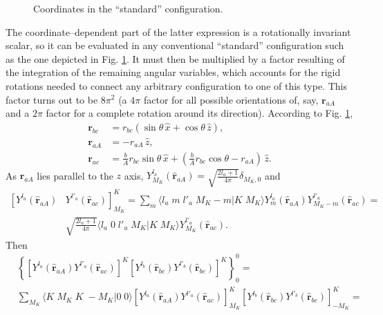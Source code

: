 \begin{subappendices}
\begin{figure}
\vspace{-3cm}
\caption{Coordinates in the ``standard'' configuration.}\label{figC6AppF2}
\end{figure}
The coordinate--dependent part of the latter expression is  a rotationally invariant scalar, so it can be evaluated in any conventional ``standard'' configuration such as the one depicted in Fig. \ref{figC6AppF2}. It must then be multiplied by a factor resulting of the integration of the remaining angular variables, which accounts for the rigid rotations needed to connect any arbitrary configuration to one of this type. This factor turns out to be $8\pi^2$ (a $4\pi$ factor for all possible orientations of, say, $\mathbf r_{aA}$ and a $2\pi$ factor for a complete rotation around its direction). According to Fig. \ref{figC6AppF2},
\begin{equation}\label{eqC6AppF22}
\begin{split}
\mathbf{r}_{bc}&=r_{bc}\left(\sin \theta\, \hat x+\cos \theta\,\hat z \right),\\
\mathbf{r}_{aA}&=-r_{aA}\,\hat z,\\
\mathbf{r}_{ac}&=\frac{b}{A}r_{bc}\sin \theta\,\hat x+\left(\frac{b}{A}r_{bc}\cos \theta-r_{aA}\right)\,\hat z.
\end{split}
\end{equation}
As $\mathbf{r}_{aA}$ lies parallel to the $z$ axis, $Y^{l_a}_{M_K} (\hat{\mathbf r}_{aA})=\sqrt{\frac{2l_a+1}{4\pi}}\delta_{M_K,0}$ and
\begin{equation}\label{eqC6AppG22}
\begin{split}
\left[ Y^{l_a} (\hat{\mathbf r}_{aA})\right.&\left. Y^{l'_a} (\hat{ \mathbf r}_{ac})\right]^K_{M_K}=\sum_{m}\langle l_a\;m\;l'_a\;M_K-m|K\;M_K\rangle Y^{l_a}_{m} (\hat{ \mathbf r}_{aA})Y^{l'_a}_{M_K-m} (\hat{\mathbf r}_{ac})=\\
&\sqrt{\frac{2l_a+1}{4\pi}} \langle l_a\;0\;l'_a\;M_K|K\;M_K\rangle Y^{l'_a}_{M_K} (\hat{ \mathbf r}_{ac}).
\end{split}
\end{equation}
Then
\begin{equation}\label{eqC6AppG23}
\begin{split}
&\left\{\left[ Y^{l_a} (\hat{\mathbf r}_{aA}) Y^{l'_a} (\hat{ \mathbf r}_{ac})\right]^K\left[ Y^{l_b} (\hat{\mathbf r}_{bc}) Y^{l'_b} (\hat{\mathbf r}_{bc})\right]^{K} \right\}^0_0=\\
&\sum_{M_K}\langle K\;M_K\;K\;-M_K|0\;0\rangle \left[ Y^{l_a} (\hat{\mathbf r}_{aA}) Y^{l'_a} (\hat{ \mathbf r}_{ac})\right]^K_{M_K}\left[ Y^{l_b} (\hat{\mathbf r}_{bc}) Y^{l'_b} (\hat{\mathbf r}_{bc})\right]^{K}_{-M_K}=\\

\end{split}
\end{equation}
\end{subappendices}
